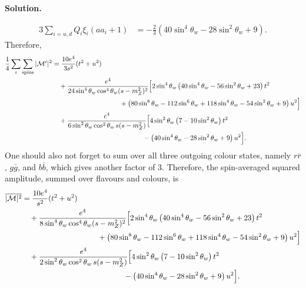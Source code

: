 \documentclass[a4paper,11pt]{article}
\newenvironment{solution}{\par\medskip\noindent\textbf{Solution.}\par\smallskip}{\par\medskip}
\begin{document}
\begin{solution}
\begin{equation}
\begin{aligned}
    3\sum_{i=u,d}Q_i\xi_i(aa_i+1)
    &=
    -\frac{2}{3}
    \left(
        40\sin^4\theta_w-28\sin^2\theta_w+9
    \right).
\end{aligned}
\end{equation}
Therefore,
\begin{equation}
\begin{aligned}
    \frac{1}{4}\sum_i\sum_{\mathrm{spins}}|\mathcal M^i|^2
    &=
    \frac{10e^4}{3s^2}(t^2+u^2)
    \\
    &\quad+
    \frac{e^4}
    {24\sin^4\theta_w\cos^4\theta_w(s-m_Z^2)^2}
    \Big[
        2\sin^4\theta_w
        \left(
            40\sin^4\theta_w-56\sin^2\theta_w+23
        \right)t^2
    \\
    &\hspace{3.5cm}
        +
        \left(
            80\sin^8\theta_w-112\sin^6\theta_w
            +118\sin^4\theta_w-54\sin^2\theta_w+9
        \right)u^2
    \Big]
    \\
    &\quad+
    \frac{e^4}
    {6\sin^2\theta_w\cos^2\theta_w\,s(s-m_Z^2)}
    \Big[
        4\sin^2\theta_w
        \left(7-10\sin^2\theta_w\right)t^2
    \\
    &\hspace{4.7cm}
        -
        \left(
            40\sin^4\theta_w-28\sin^2\theta_w+9
        \right)u^2
    \Big].
\end{aligned}
\end{equation}
One should also not forget to sum over all three outgoing colour states,
namely $r\bar r$, $g\bar g$, and $b\bar b$, which gives another factor
of $3$. Therefore, the spin-averaged squared amplitude, summed over
flavours and colours, is
\begin{equation}
\begin{aligned}
    \overline{|\mathcal M|^2}
    &=
    \frac{10e^4}{s^2}(t^2+u^2)
    \\
    &\quad+
    \frac{e^4}
    {8\sin^4\theta_w\cos^4\theta_w(s-m_Z^2)^2}
    \Big[
        2\sin^4\theta_w
        \left(
            40\sin^4\theta_w-56\sin^2\theta_w+23
        \right)t^2
    \\
    &\hspace{3.5cm}
        +
        \left(
            80\sin^8\theta_w-112\sin^6\theta_w
            +118\sin^4\theta_w-54\sin^2\theta_w+9
        \right)u^2
    \Big]
    \\
    &\quad+
    \frac{e^4}
    {2\sin^2\theta_w\cos^2\theta_w\,s(s-m_Z^2)}
    \Big[
        4\sin^2\theta_w
        \left(7-10\sin^2\theta_w\right)t^2
    \\
    &\hspace{4.7cm}
        -
        \left(
            40\sin^4\theta_w-28\sin^2\theta_w+9
        \right)u^2
    \Big].
\end{aligned}
\end{equation}


\end{solution}
\end{document}
